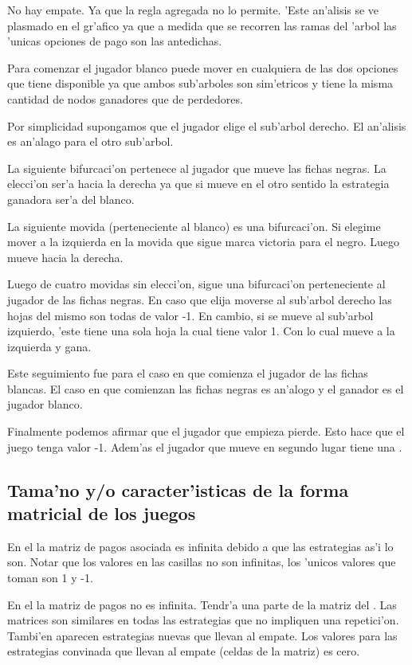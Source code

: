 No hay empate. Ya que la regla agregada no lo permite. 'Este an'alisis se ve plasmado en el gr'afico ya que a medida que se recorren las ramas del 'arbol las 'unicas opciones de pago son las antedichas.

Para comenzar el jugador blanco puede mover en cualquiera de las dos opciones que tiene disponible ya que ambos sub'arboles son sim'etricos y tiene la misma cantidad de nodos ganadores que de perdedores.

Por simplicidad supongamos que el jugador elige el sub'arbol derecho. El an'alisis es an'alago para el otro sub'arbol.

La siguiente bifurcaci'on pertenece al jugador que mueve las fichas negras. La elecci'on ser'a hacia la derecha ya que si mueve en el otro sentido la estrategia ganadora ser'a del blanco.

La siguiente movida (perteneciente al blanco) es una bifurcaci'on. Si elegime mover a la izquierda en la movida que sigue marca victoria para el negro. Luego mueve hacia la derecha.

Luego de cuatro movidas sin elecci'on, sigue una bifurcaci'on perteneciente al jugador de las fichas negras. En caso que elija moverse al sub'arbol derecho las hojas del mismo son todas de valor -1. En cambio, si se mueve al sub'arbol izquierdo, 'este tiene una sola hoja la cual tiene valor 1. Con lo cual mueve a la izquierda y gana.

Este seguimiento fue para el caso en que comienza el jugador de las fichas blancas. El caso en que comienzan las fichas negras es an'alogo y el ganador es el jugador blanco.

Finalmente podemos afirmar que el jugador que empieza pierde. Esto hace que el juego tenga valor -1. Adem'as el jugador que mueve en segundo lugar tiene una .


\subsection{Tama'no y/o caracter'isticas de la forma matricial de los juegos}

En el  la matriz de pagos asociada es infinita debido a que las estrategias as'i lo son. Notar que los valores en las casillas no son infinitas, los 'unicos valores que toman son 1 y -1.

En el  la matriz de pagos no es infinita. Tendr'a una parte de la matriz del . Las matrices son similares en todas las estrategias que no impliquen una repetici'on. Tambi'en aparecen estrategias nuevas que llevan al empate. Los valores para las estrategias convinada que llevan al empate (celdas de la matriz) es cero.

